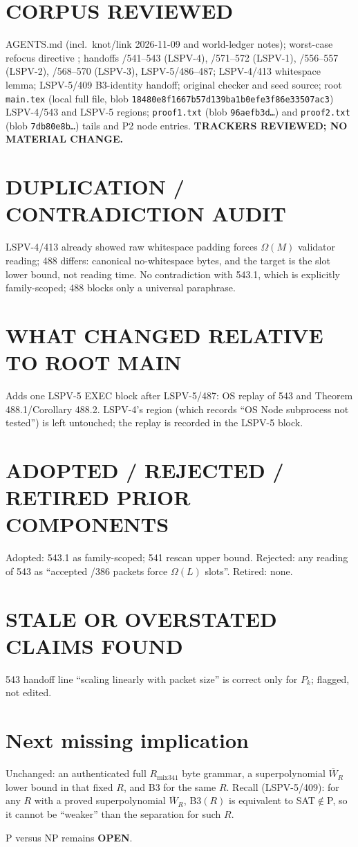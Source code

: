 \documentclass[11pt]{article}
\begin{document}
\section*{CORPUS REVIEWED}
AGENTS.md (incl.\ knot/link 2026-11-09 and world-ledger notes); worst-case refocus directive ; handoffs /541--543 (LSPV-4), /571--572 (LSPV-1), /556--557 (LSPV-2), /568--570 (LSPV-3), LSPV-5/486--487; LSPV-4/413 whitespace lemma; LSPV-5/409 B3-identity handoff; original checker and seed source; root \texttt{main.tex} (local full file, blob \texttt{18480e8f1667b57d139ba1b0efe3f86e33507ac3}) LSPV-4/543 and LSPV-5 regions; \texttt{proof1.txt} (blob \texttt{96aefb3d\ldots}) and \texttt{proof2.txt} (blob \texttt{7db80e8b\ldots}) tails and P2 node entries. \textbf{TRACKERS REVIEWED; NO MATERIAL CHANGE.}

\section*{DUPLICATION / CONTRADICTION AUDIT}
LSPV-4/413 already showed raw whitespace padding forces $\Omega(M)$ validator reading; 488 differs: canonical no-whitespace bytes, and the target is the slot lower bound, not reading time. No contradiction with 543.1, which is explicitly family-scoped; 488 blocks only a universal paraphrase.

\section*{WHAT CHANGED RELATIVE TO ROOT MAIN}
Adds one LSPV-5 EXEC block after LSPV-5/487: OS replay of 543 and Theorem 488.1/Corollary 488.2. LSPV-4's region (which records ``OS Node subprocess not tested'') is left untouched; the replay is recorded in the LSPV-5 block.

\section*{ADOPTED / REJECTED / RETIRED PRIOR COMPONENTS}
Adopted: 543.1 as family-scoped; 541 rescan upper bound. Rejected: any reading of 543 as ``accepted /386 packets force $\Omega(L)$ slots''. Retired: none.

\section*{STALE OR OVERSTATED CLAIMS FOUND}
543 handoff line ``scaling linearly with packet size'' is correct only for $P_k$; flagged, not edited.

\section*{Next missing implication}
Unchanged: an authenticated full $R_{\mathrm{mix341}}$ byte grammar, a superpolynomial $\overline W_R$ lower bound in that fixed $R$, and B3 for the same $R$. Recall (LSPV-5/409): for any $R$ with a proved superpolynomial $\overline W_R$, B3$(R)$ is equivalent to SAT$\notin$P, so it cannot be ``weaker'' than the separation for such $R$.

P versus NP remains \textbf{OPEN}.
\end{document}
